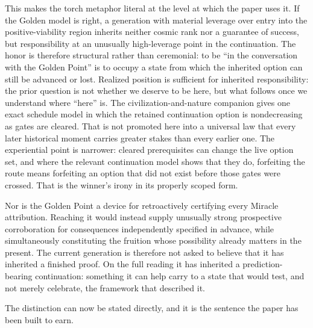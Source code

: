 This makes the torch metaphor literal at the level at which the paper
uses it. If the Golden model is right, a generation with material leverage
over entry into the positive-viability region inherits neither cosmic
rank nor a guarantee of success, but responsibility at an unusually
high-leverage point in the continuation. The honor is therefore
structural rather than ceremonial: to be ``in the conversation with the
Golden Point'' is to occupy a state from which the inherited option can
still be advanced or lost. Realized position is sufficient for inherited
responsibility: the prior question is not whether we deserve to be here,
but what follows once we understand where ``here'' is. The
civilization-and-nature companion gives one exact schedule model in which
the retained continuation option is nondecreasing as gates are cleared.
That is not promoted here into a universal law that every later historical
moment carries greater stakes than every earlier one. The experiential
point is narrower: cleared prerequisites can change the live option set,
and where the relevant continuation model shows that they do, forfeiting
the route means forfeiting an option that did not exist before those gates
were crossed. That is the winner's irony in its properly scoped form.

Nor is the Golden Point a device for retroactively certifying every
Miracle attribution. Reaching it would instead supply unusually strong
prospective corroboration for consequences independently specified in
advance, while simultaneously constituting the fruition whose possibility
already matters in the present. The current generation is therefore not
asked to believe that it has inherited a finished proof. On the full
reading it has inherited a prediction-bearing continuation: something it
can help carry to a state that would test, and not merely celebrate, the
framework that described it.

The distinction can now be stated directly, and it is the sentence the
paper has been built to earn.

